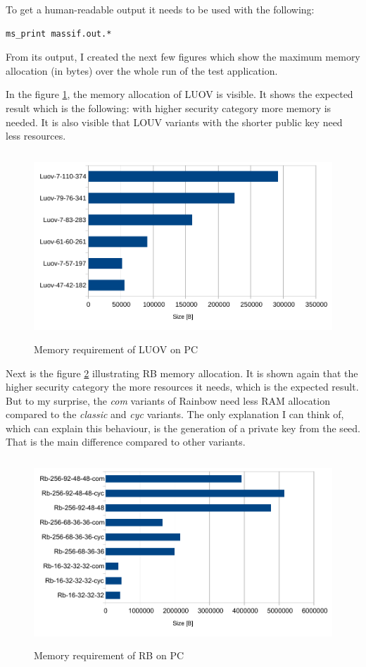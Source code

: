 \documentclass[thesis=M,english]{FITthesis}[2019/12/23]
\begin{document}
\noindent
To get a human-readable output it needs to be used with the following:
\begin{lstlisting}[frame=single]
ms_print massif.out.*
\end{lstlisting}
\noindent
From its output, I created the next few figures which show the maximum memory allocation (in bytes) over the whole run of the test application.

\bigskip
\noindent
In the figure \ref{mem-pc-luov}, the memory allocation of LUOV is visible. It shows the expected result which is the following: with higher security category more memory is needed. It is also visible that LOUV variants with the shorter public key need less resources. 

\begin{figure}[H]
\centering
\includegraphics[width=13cm,height=7cm]{images/mem-pc-luov.pdf}
\caption{Memory requirement of LUOV on PC}
\label{mem-pc-luov}
\end{figure}

\noindent
Next is the figure \ref{mem-pc-rb} illustrating RB memory allocation. It is shown again that the higher security category the more resources it needs, which is the expected result. But to my surprise, the \textit{com} variants of Rainbow need less RAM allocation compared to the \textit{classic} and \textit{cyc} variants. The only explanation I can think of, which can explain this behaviour, is the generation of a private key from the seed. That is the main difference compared to other variants.
\begin{figure}[H]
\centering
\includegraphics[width=13cm,height=7cm]{images/mem-pc-rb.pdf}
\caption{Memory requirement of RB on PC}
\label{mem-pc-rb}
\end{figure}
\end{document}
